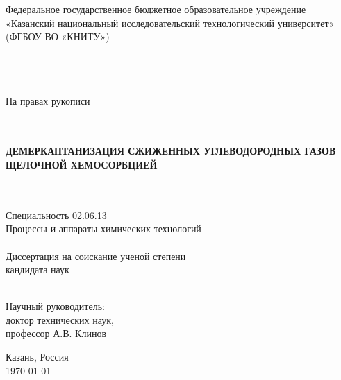 \thispagestyle{empty}


\vspace{0pt plus2fill} %
\begin{center}
	Федеральное государственное бюджетное образовательное учреждение \\
	«Казанский национальный исследовательский технологический университет» \\
	(ФГБОУ ВО «КНИТУ») \\ \ \\ \ \\ \
\end{center}

\begin{flushright}
	На правах рукописи \\
\end{flushright}


\vspace*{100pt}
\begin{center}
{\large 
	} \\ \ \\	

\textbf {\large %
ДЕМЕРКАПТАНИЗАЦИЯ СЖИЖЕННЫХ УГЛЕВОДОРОДНЫХ ГАЗОВ ЩЕЛОЧНОЙ ХЕМОСОРБЦИЕЙ
} \\ \ \\ \


Специальность 02.06.13\\
Процессы и аппараты химических технологий \\ \ \\ Диссертация на соискание ученой степени \\ кандидата наук \\ \ \\ 
\end{center}

\begin{flushright}
	Научный руководитель:\\ доктор технических наук, \\ профессор А.В. Клинов
\end{flushright}

\vspace{0pt plus2fill} %

\begin{center}
	Казань, Россия \\
	{\today}
\end{center}


